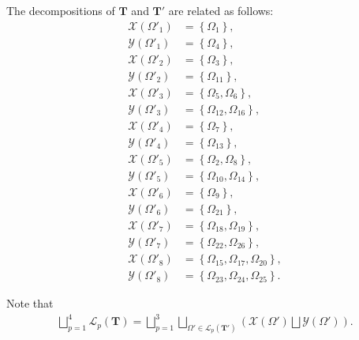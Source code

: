 \documentclass[superscriptaddress,onecolumn,nofootinbib,longbibliography,a4paper,accepted=2026-09-29]{quantumarticle}
\theoremstyle{plain}
\theoremstyle{definition}
\numberwithin{thm}{section}
\numberwithin{assumption}{section}
\numberwithin{lemma}{section}
\numberwithin{prop}{section}
\numberwithin{cor}{section}
\numberwithin{definition}{section}
\numberwithin{rmk}{section}
\numberwithin{equation}{section}
\newcommand{\lrb}[1]{\left ( #1 \right )}
\newcommand{\lrcb}[1]{\left \{ #1 \right \}}
\newcommand{\mbf}{\mathbf{T}}
\begin{document}
\begin{itemize}
The decompositions of $\mbf$ and $\mbf'$ are related as follows:
\begin{align}
\mathcal{X}(\Omega'_1)&=\lrcb{\Omega_1}, \\
\mathcal{Y}(\Omega'_1)&=\lrcb{\Omega_4}, \\
\mathcal{X}(\Omega'_2)&=\lrcb{\Omega_3}, \\
\mathcal{Y}(\Omega'_2)&=\lrcb{\Omega_{11}}, \\
\mathcal{X}(\Omega'_3)&=\lrcb{\Omega_5, \Omega_6}, \\
\mathcal{Y}(\Omega'_3)&=\lrcb{\Omega_{12}, \Omega_{16}}, \\
\mathcal{X}(\Omega'_4)&=\lrcb{\Omega_7}, \\
\mathcal{Y}(\Omega'_4)&=\lrcb{\Omega_{13}}, \\
\mathcal{X}(\Omega'_5)&=\lrcb{\Omega_2, \Omega_8}, \\
\mathcal{Y}(\Omega'_5)&=\lrcb{\Omega_{10}, \Omega_{14}}, \\
\mathcal{X}(\Omega'_6)&=\lrcb{\Omega_9}, \\
\mathcal{Y}(\Omega'_6)&=\lrcb{\Omega_{21}}, \\
\mathcal{X}(\Omega'_7)&=\lrcb{\Omega_{18}, \Omega_{19}}, \\
\mathcal{Y}(\Omega'_7)&=\lrcb{\Omega_{22}, \Omega_{26}}, \\
\mathcal{X}(\Omega'_8)&=\lrcb{\Omega_{15}, \Omega_{17}, \Omega_{20}}, \\
\mathcal{Y}(\Omega'_8)&=\lrcb{\Omega_{23}, \Omega_{24},\Omega_{25}}.
\end{align}

Note that
\begin{align}
\bigsqcup_{p=1}^4 \mathcal{L}_p(\mbf) = \bigsqcup_{p=1}^3 \bigsqcup_{\Omega' \in \mathcal{L}_p(\mbf')}\lrb{\mathcal{X}(\Omega') \bigsqcup \mathcal{Y}(\Omega')}.  
\end{align}


\end{itemize}
\end{document}
